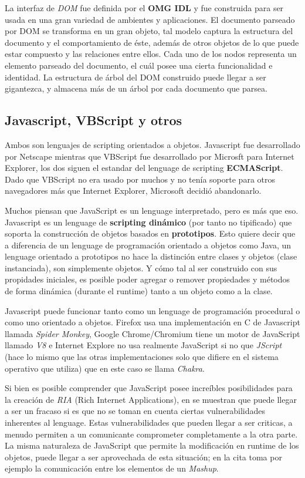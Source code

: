     La interfaz de \textit{DOM} fue definida por el \textbf{OMG IDL} y fue construida para ser usada en una gran variedad de ambientes y aplicaciones. El documento parseado por DOM se transforma en un gran objeto, tal modelo captura la estructura del documento y el comportamiento de éste, además de otros objetos de lo que puede estar compuesto y las relaciones entre ellos. Cada uno de los nodos representa un elemento parseado del documento, el cuál posee una cierta funcionalidad e identidad. La estructura de árbol del DOM construido puede llegar a ser gigantezca, y almacena más de un árbol por cada documento que parsea. 
            
    \subsection{Javascript, VBScript y otros}
    \label{chap2:JS}
    Ambos son lenguajes de scripting orientados a objetos. Javascript fue desarrollado por Netscape mientras que VBScript fue desarrollado por Microsft para Internet Explorer, los dos siguen el estandar del lenguage de scripting \textbf{ECMAScript}. Dado que VBScript no era usado por muchos y no tenía soporte para otros navegadores más que Internet Explorer, Microsoft decidió abandonarlo.

    Muchos piensan que JavaScript es un lenguage interpretado, pero es más que eso. Javascript es un lenguage de \textbf{scripting dinámico} (por tanto no tipificado) que soporta la construcción de objetos basados en \textbf{prototipos}. Esto quiere decir que a diferencia de un lenguage de programación orientado a objetos como Java, un lenguage orientado a prototipos no hace la distinción entre clases y objetos (clase instanciada), son simplemente objetos. Y cómo tal al ser construido con sus propidades iniciales, es posible poder agregar o remover propiedades y métodos de forma dinámica (durante el runtime) tanto a un objeto como a la clase.
            
    Javascript puede funcionar tanto como un lenguage de programación procedural o como uno orientado a objetos. Firefox usa una implementación en C de Javascript llamada \textit{Spider Monkey}, Google Chrome/Chromium tiene un motor de JavaScript llamado \textit{V8} e Internet Explore no usa realmente JavaScript si no que \textit{JScript} (hace lo mismo que las otras implementaciones solo que difiere en el sistema operativo que utiliza) que en este caso se llama \textit{Chakra}.
            
    Si bien es posible comprender que JavaScript posee increíbles posibilidades para la creación de \textit{RIA} (Rich Internet Applications), en \cite{barth2009attacks, Barth2009, Barth2010, Liu2012, Singh2014} se muestran que puede llegar a ser un fracaso si es que no se toman en cuenta ciertas vulnerabilidades inherentes al lenguage. Estas vulnerabilidades que pueden llegar a ser criticas, a menudo permiten a un comunicante comprometer completamente a la otra parte. La misma naturaleza de JavaScript que permite la modificación en runtime de los objetos, puede llegar a ser aprovechada de esta situación; en la cita toma por ejemplo la comunicación entre los elementos de un \textit{Mashup}.


